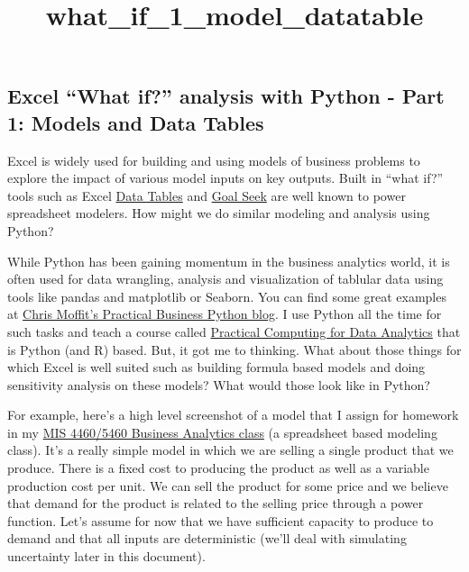 \documentclass[11pt]{article}
\title{what\_if\_1\_model\_datatable}
\begin{document}
    
    \maketitle
    
    

    
    \hypertarget{excel-what-if-analysis-with-python---part-1-models-and-data-tables}{%
\subsection{Excel ``What if?'' analysis with Python - Part 1: Models and
Data
Tables}\label{excel-what-if-analysis-with-python---part-1-models-and-data-tables}}

    Excel is widely used for building and using models of business problems
to explore the impact of various model inputs on key outputs. Built in
``what if?'' tools such as Excel
\href{https://support.microsoft.com/en-us/office/calculate-multiple-results-by-using-a-data-table-e95e2487-6ca6-4413-ad12-77542a5ea50b}{Data
Tables} and
\href{https://support.microsoft.com/en-us/office/use-goal-seek-to-find-the-result-you-want-by-adjusting-an-input-value-320cb99e-f4a4-417f-b1c3-4f369d6e66c7}{Goal
Seek} are well known to power spreadsheet modelers. How might we do
similar modeling and analysis using Python?

While Python has been gaining momentum in the business analytics world,
it is often used for data wrangling, analysis and visualization of
tablular data using tools like pandas and matplotlib or Seaborn. You can
find some great examples at \href{https://pbpython.com/}{Chris Moffit's
Practical Business Python blog}. I use Python all the time for such
tasks and teach a course called
\href{http://www.sba.oakland.edu/faculty/isken/courses/mis5470/}{Practical
Computing for Data Analytics} that is Python (and R) based. But, it got
me to thinking. What about those things for which Excel is well suited
such as building formula based models and doing sensitivity analysis on
these models? What would those look like in Python?

For example, here's a high level screenshot of a model that I assign for
homework in my
\href{http://www.sba.oakland.edu/faculty/isken/courses/mis5460/}{MIS
4460/5460 Business Analytics class} (a spreadsheet based modeling
class). It's a really simple model in which we are selling a single
product that we produce. There is a fixed cost to producing the product
as well as a variable production cost per unit. We can sell the product
for some price and we believe that demand for the product is related to
the selling price through a power function. Let's assume for now that we
have sufficient capacity to produce to demand and that all inputs are
deterministic (we'll deal with simulating uncertainty later in this
document).
\end{document}
